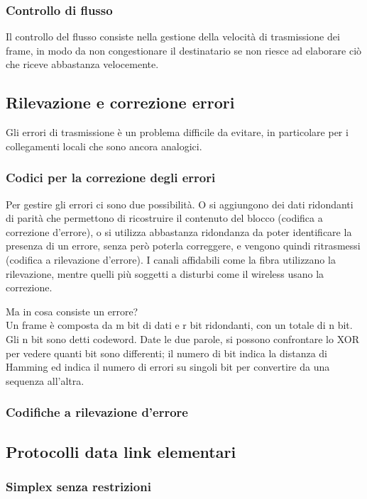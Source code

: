 \subsubsection{Controllo di flusso}
Il controllo del flusso consiste nella gestione della velocità di trasmissione dei frame, in modo da non congestionare il destinatario se non riesce ad elaborare ciò che riceve abbastanza velocemente.

\subsection{Rilevazione e correzione errori} %
Gli errori di trasmissione è un problema difficile da evitare, in particolare per i collegamenti locali che sono ancora analogici.

\subsubsection{Codici per la correzione degli errori}
Per gestire gli errori ci sono due possibilità. 
O si aggiungono dei dati ridondanti di parità che permettono di ricostruire il contenuto del blocco (codifica a correzione d'errore),
o si utilizza abbastanza ridondanza da poter identificare la presenza di un errore, senza però poterla correggere, e vengono quindi ritrasmessi (codifica a rilevazione d'errore).
I canali affidabili come la fibra utilizzano la rilevazione, mentre quelli più soggetti a disturbi come il wireless usano la correzione.

Ma in cosa consiste un errore? \\
Un frame è composta da m bit di dati e r bit ridondanti, con un totale di n bit.
Gli n bit sono detti codeword. 
Date le due parole, si possono confrontare lo XOR per vedere quanti bit sono differenti;
il numero di bit indica la distanza di Hamming ed indica il numero di errori su singoli bit per convertire da una sequenza all'altra.


\subsubsection{Codifiche a rilevazione d'errore}


\subsection{Protocolli data link elementari} %

\subsubsection{Simplex senza restrizioni}

